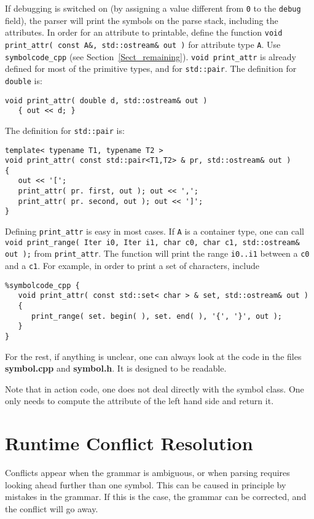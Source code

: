 \documentclass{article}
\begin{document}
If debugging is switched on (by assigning a value
different from \verb+0+ to the \verb+debug+ field), 
the parser will print the symbols on the parse stack, including the attributes.
In order for an attribute to printable, define the function
\verb+void print_attr( const A&, std::ostream& out )+ 
for attribute type \verb+A+.
Use \verb+symbolcode_cpp+ (see Section~\ref{Sect_remaining}). 
\verb+void print_attr+ is already defined for most of the primitive types, and
for \verb+std::pair+.
The definition for \verb+double+ is:
\begin{verbatim}
void print_attr( double d, std::ostream& out )
   { out << d; } \end{verbatim}
The definition for \verb+std::pair+ is: 
\begin{verbatim}
template< typename T1, typename T2 > 
void print_attr( const std::pair<T1,T2> & pr, std::ostream& out )
{
   out << '[';
   print_attr( pr. first, out ); out << ',';
   print_attr( pr. second, out ); out << ']';
} \end{verbatim}

\noindent
Defining \verb+print_attr+ is easy in most cases. 
If \verb+A+ is a container type, one can call \\
\verb+void print_range( Iter i0, Iter i1, char c0, char c1, std::ostream& out );+
from \verb+print_attr+. 
The function will print the range \verb+i0..i1+
between a \verb+c0+ and a \verb+c1+. 
For example, in order to print a set of characters, include 
\begin{verbatim}
%symbolcode_cpp {
   void print_attr( const std::set< char > & set, std::ostream& out )
   {
      print_range( set. begin( ), set. end( ), '{', '}', out );
   }
} \end{verbatim}
For the rest, if anything is unclear, one can always look at
the code in the files {\bf symbol.cpp} and {\bf symbol.h}.
It is designed to be readable. 

Note that in action code, one does not deal directly with
the symbol class. One only needs to compute the
attribute of the left hand side and return it. 

\section{Runtime Conflict Resolution}
\label{Sect_runtime}

Conflicts appear when the grammar is ambiguous,
or when parsing requires looking ahead further than one symbol.
This can be caused in principle by mistakes in the grammar. 
If this is the case, the grammar can be corrected,
and the conflict will go away. 
\end{document}
